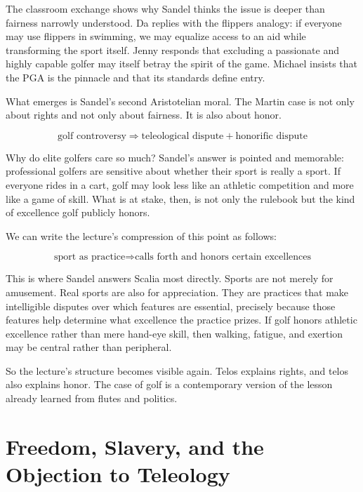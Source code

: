 The classroom exchange shows why Sandel thinks the issue is deeper than fairness narrowly understood. Da replies with the flippers analogy: if everyone may use flippers in swimming, we may equalize access to an aid while transforming the sport itself. Jenny responds that excluding a passionate and highly capable golfer may itself betray the spirit of the game. Michael insists that the PGA is the pinnacle and that its standards define entry.

What emerges is Sandel's second Aristotelian moral. The Martin case is not only about rights and not only about fairness. It is also about honor.

\begin{equation}
\text{golf controversy}
\Longrightarrow
\text{teleological dispute}+\text{honorific dispute}
\end{equation}

Why do elite golfers care so much? Sandel's answer is pointed and memorable: professional golfers are sensitive about whether their sport is really a sport. If everyone rides in a cart, golf may look less like an athletic competition and more like a game of skill. What is at stake, then, is not only the rulebook but the kind of excellence golf publicly honors.

We can write the lecture's compression of this point as follows:

\begin{equation}
\text{sport as practice}
\Longrightarrow
\text{calls forth and honors certain excellences}
\end{equation}

This is where Sandel answers Scalia most directly. Sports are not merely for amusement. Real sports are also for appreciation. They are practices that make intelligible disputes over which features are essential, precisely because those features help determine what excellence the practice prizes. If golf honors athletic excellence rather than mere hand-eye skill, then walking, fatigue, and exertion may be central rather than peripheral.

So the lecture's structure becomes visible again. Telos explains rights, and telos also explains honor. The case of golf is a contemporary version of the lesson already learned from flutes and politics.

\section{Freedom, Slavery, and the Objection to Teleology}

